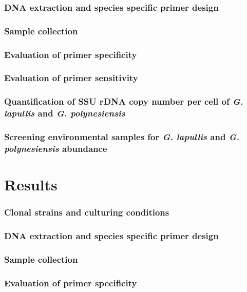 \documentclass[12pt]{article}
\begin{document}
\subsubsection{DNA extraction and species specific primer design}

\subsubsection{Sample collection}

\subsubsection{Evaluation of primer specificity}

\subsubsection{Evaluation of primer sensitivity}

\subsubsection{Quantification of SSU rDNA copy number per cell of \emph{G. lapullis} and \emph{G. polynesiensis}}

\subsubsection{Screening environmental samples for \emph{G. lapullis} and \emph{G. polynesiensis} abundance}

\section{Results}
\subsubsection{Clonal strains and culturing conditions}

\subsubsection{DNA extraction and species specific primer design}

\subsubsection{Sample collection}

\subsubsection{Evaluation of primer specificity}
\end{document}
